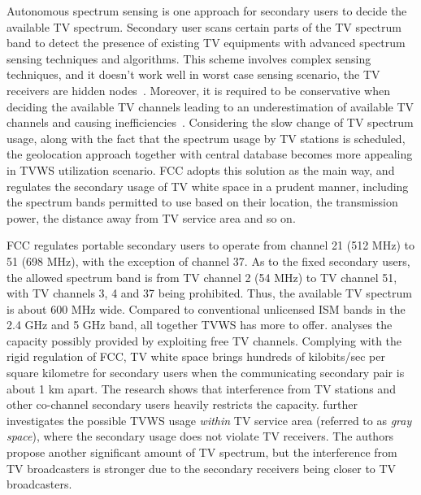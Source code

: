 Autonomous spectrum sensing is one approach for secondary users to decide the available TV spectrum. 
Secondary user scans certain parts of the TV spectrum band to detect the presence of existing TV equipments with advanced spectrum sensing techniques and algorithms.
This scheme involves complex sensing techniques, and it doesn't work well in worst case sensing scenario, \ie the TV receivers are hidden nodes~\cite{maximum_power_TVWS_dyspan_2011}.
Moreover, it is required to be conservative when deciding the available TV channels leading to an underestimation of available TV channels and causing inefficiencies~\cite{geoTVprotection08dyspan}.
Considering the slow change of TV spectrum usage, along with the fact that the spectrum usage by TV stations is scheduled, the geolocation approach together with central database becomes more appealing in TVWS utilization scenario.
FCC adopts this solution as the main way, and regulates the secondary usage of TV white space in a prudent manner, including the spectrum bands permitted to use based on their location, the transmission power, the distance away from TV service area and so on.


FCC regulates portable secondary users to operate from channel 21 (512 MHz) to 51 (698 MHz), with the exception of channel 37.
As to the fixed secondary users, the allowed spectrum band is from TV channel 2 (54 MHz) to TV channel 51, with TV channels 3, 4 and 37 being prohibited.
Thus, the available TV spectrum is about 600 MHz wide. 
Compared to conventional unlicensed ISM bands in the 2.4 GHz and 5 GHz band, all together TVWS has more to offer.
\cite{DySpAN10MeasuringWhitespaceCapacity} analyses the capacity possibly provided by exploiting free TV channels. 
Complying with the rigid regulation of FCC, TV white space brings hundreds of kilobits/sec per square kilometre for secondary users when the communicating secondary pair is about 1 km apart.
The research shows that interference from TV stations and other co-channel secondary users heavily restricts the capacity.
\cite{tvgreyspace12} further investigates the possible TVWS usage \textit{within} TV service area (referred to as \textit{gray space}), where the secondary usage does not violate TV receivers.
The authors propose another significant amount of TV spectrum, but the interference from TV broadcasters is stronger due to the secondary receivers being closer to TV broadcasters. 

